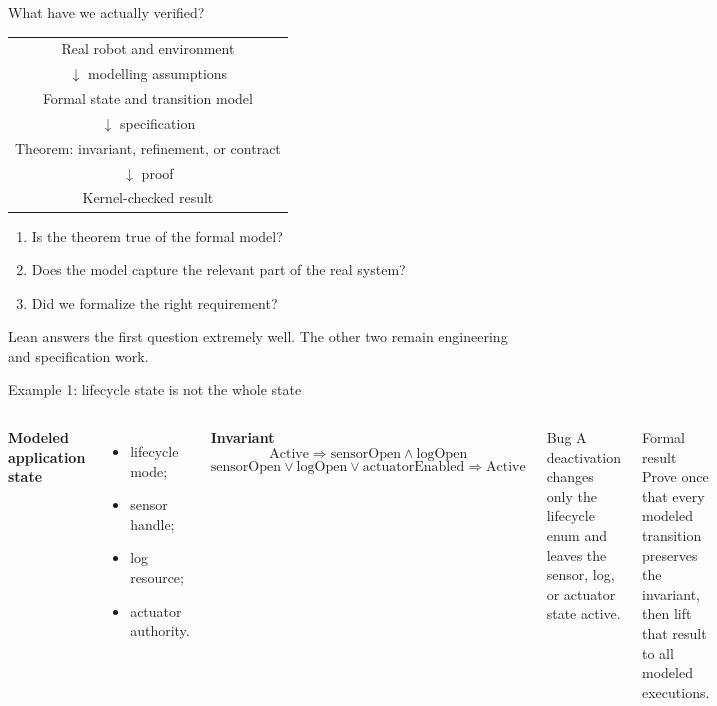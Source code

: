 \documentclass[aspectratio=169,10pt]{beamer}
\begin{document}
\begin{frame}{What have we actually verified?}
  \begin{center}
    \begin{tabular}{c}
      Real robot and environment \\
      $\downarrow$ modelling assumptions \\
      Formal state and transition model \\
      $\downarrow$ specification \\
      Theorem: invariant, refinement, or contract \\
      $\downarrow$ proof \\
      \alert{Kernel-checked result}
    \end{tabular}
  \end{center}

  \vspace{0.7em}
  \begin{enumerate}
    \item Is the theorem true of the formal model?
    \item Does the model capture the relevant part of the real system?
    \item Did we formalize the right requirement?
  \end{enumerate}

  Lean answers the first question extremely well. The other two remain
  engineering and specification work.
\end{frame}

\begin{frame}{Example 1: lifecycle state is not the whole state}
  \begin{columns}[T,onlytextwidth]
      \textbf{Modeled application state}
      \begin{itemize}
        \item lifecycle mode;
        \item sensor handle;
        \item log resource;
        \item actuator authority.
      \end{itemize}

      \textbf{Invariant}
      \[
        \mathrm{Active} \Rightarrow
        \mathrm{sensorOpen} \land \mathrm{logOpen}
      \]
      \[
        \mathrm{sensorOpen} \lor \mathrm{logOpen} \lor
        \mathrm{actuatorEnabled}
        \Rightarrow \mathrm{Active}
      \]

      \begin{alertblock}{Bug}
        A deactivation changes only the lifecycle enum and leaves the sensor,
        log, or actuator state active.
      \end{alertblock}

      \begin{block}{Formal result}
        Prove once that every modeled transition preserves the invariant, then
        lift that result to all modeled executions.
      \end{block}
  \end{columns}
\end{frame}
\end{document}
